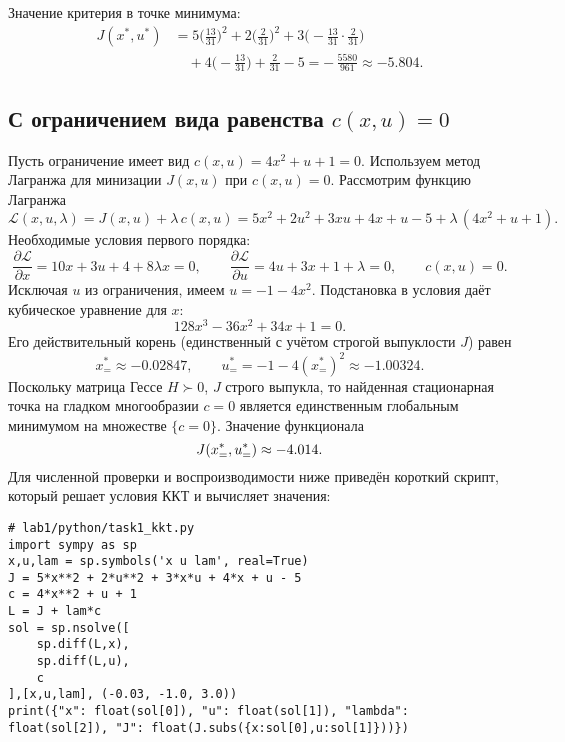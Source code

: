 Значение критерия в точке минимума:
\begin{align*}
J(x^{\ast},u^{\ast})
&=5\Big(\tfrac{13}{31}\Big)^2
 +2\Big(\tfrac{2}{31}\Big)^2
 +3\Big(-\tfrac{13}{31}\cdot\tfrac{2}{31}\Big)\\
&\quad +4\Big(-\tfrac{13}{31}\Big)
 +\tfrac{2}{31}-5
 = -\,\tfrac{5580}{961}\approx -5.804.
\end{align*}


\subsection{С ограничением вида равенства \(c(x,u)=0\)}
Пусть ограничение имеет вид \(c(x,u)=4x^2+u+1=0\). Используем метод Лагранжа для минизации \(J(x,u)\) при \(c(x,u)=0\). Рассмотрим функцию Лагранжа
\[
\mathcal{L}(x,u,\lambda)=J(x,u)+\lambda\,c(x,u)=5x^2+2u^2+3xu+4x+u-5+\lambda\,(4x^2+u+1).
\]
Необходимые условия первого порядка:
\[
\frac{\partial \mathcal{L}}{\partial x}=10x+3u+4+8\lambda x=0,\qquad
\frac{\partial \mathcal{L}}{\partial u}=4u+3x+1+\lambda=0,\qquad
c(x,u)=0.
\]
Исключая \(u\) из ограничения, имеем \(u=-1-4x^2\). Подстановка в условия даёт кубическое уравнение для \(x\):
\[
128x^3-36x^2+34x+1=0.
\]
Его действительный корень (единственный с учётом строгой выпуклости \(J\)) равен
\[
 x^{\ast}_{=}\approx -0.02847,\qquad u^{\ast}_{=}= -1-4(x^{\ast}_{=})^2\approx -1.00324.
\]
Поскольку матрица Гессе \(H\succ0\), \(J\) строго выпукла, то найденная стационарная точка на гладком многообразии \(c=0\) является единственным глобальным минимумом на множестве \(\{c=0\}\). Значение функционала
\[\small
J(x^{\ast}_{=},u^{\ast}_{=})\approx -4.014.
\]
Для численной проверки и воспроизводимости ниже приведён короткий скрипт, который решает условия ККТ и вычисляет значения:

\begin{lstlisting}[caption={Решение условий ККТ для равенства и проверка},label={lst:kkt}]
# lab1/python/task1_kkt.py
import sympy as sp
x,u,lam = sp.symbols('x u lam', real=True)
J = 5*x**2 + 2*u**2 + 3*x*u + 4*x + u - 5
c = 4*x**2 + u + 1
L = J + lam*c
sol = sp.nsolve([
    sp.diff(L,x),
    sp.diff(L,u),
    c
],[x,u,lam], (-0.03, -1.0, 3.0))
print({"x": float(sol[0]), "u": float(sol[1]), "lambda": float(sol[2]), "J": float(J.subs({x:sol[0],u:sol[1]}))})
\end{lstlisting}

